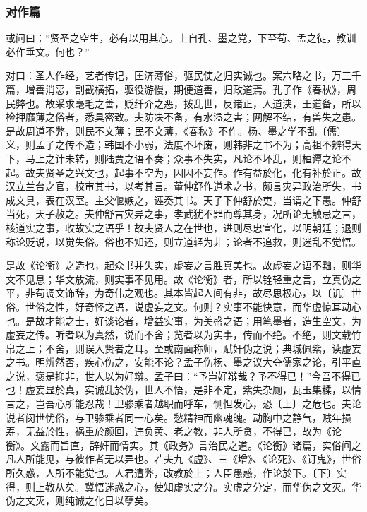 \documentclass[]{article}
\begin{document}
\hypertarget{header-n904}{%
\subsubsection{对作篇}\label{header-n904}}

或问曰：``贤圣之空生，必有以用其心。上自孔、墨之党，下至苟、孟之徒，教训必作垂文。何也？''

对曰：圣人作经，艺者传记，匡济薄俗，驱民使之归实诚也。案六略之书，万三千篇，增善消恶，割截横拓，驱役游慢，期便道善，归政道焉。孔子作《春秋》，周民弊也。故采求毫毛之善，贬纤介之恶，拨乱世，反诸正，人道浃，王道备，所以检押靡薄之俗者，悉具密致。夫防决不备，有水溢之害；网解不结，有兽失之患。是故周道不弊，则民不文薄；民不文薄，《春秋》不作。杨、墨之学不乱〔儒〕义，则孟子之传不造；韩国不小弱，法度不坏废，则韩非之书不为；高祖不辨得天下，马上之计未转，则陆贾之语不奏；众事不失实，凡论不坏乱，则桓谭之论不起。故夫贤圣之兴文也，起事不空为，因因不妄作。作有益於化，化有补於正。故汉立兰台之官，校审其书，以考其言。董仲舒作道术之书，颇言灾异政治所失，书成文具，表在汉室。主父偃嫉之，诬奏其书。天子下仲舒於吏，当谓之下愚。仲舒当死，天子赦之。夫仲舒言灾异之事，孝武犹不罪而尊其身，况所论无触忌之言，核道实之事，收故实之语乎！故夫贤人之在世也，进则尽忠宣化，以明朝廷；退则称论贬说，以觉失俗。俗也不知还，则立道轻为非；论者不追救，则迷乱不觉悟。

是故《论衡》之造也，起众书并失实，虚妄之言胜真美也。故虚妄之语不黜，则华文不见息；华文放流，则实事不见用。故《论衡》者，所以铨轻重之言，立真伪之平，非苟调文饰辞，为奇伟之观也。其本皆起人间有非，故尽思极心，以〔讥〕世俗。世俗之性，好奇怪之语，说虚妄之文。何则？实事不能快意，而华虚惊耳动心也。是故才能之士，好谈论者，增益实事，为美盛之语；用笔墨者，造生空文，为虚妄之传。听者以为真然，说而不舍；览者以为实事，传而不绝。不绝，则文载竹帛之上；不舍，则误入贤者之耳。至或南面称师，赋奸伪之说；典城佩紫，读虚妄之书。明辨然否，疾心伤之，安能不论？孟子伤杨、墨之议大夺儒家之论，引平直之说，褒是抑非，世人以为好辩。孟子曰：``予岂好辩哉？予不得已！''今吾不得已也！虚妄显於真，实诚乱於伪，世人不悟，是非不定，紫失杂厕，瓦玉集糅，以情言之，岂吾心所能忍哉！卫骖乘者越职而呼车，恻怛发心，恐〔上〕之危也。夫论说者闵世忧俗，与卫骖乘者同一心矣。愁精神而幽魂魄。动胸中之静气，贼年损寿，无益於性，祸重於颜回，违负黄、老之教，非人所贪，不得已，故为《论衡》。文露而旨直，辞奸而情实。其《政务》言治民之道。《论衡》诸篇，实俗间之凡人所能见，与彼作者无以异也。若夫九《虚》、三《增》、《论死》、《订鬼》，世俗所久惑，人所不能觉也。人君遭弊，改教於上；人臣愚惑，作论於下。〔下〕实得，则上教从矣。冀悟迷惑之心，使知虚实之分。实虚之分定，而华伪之文灭。华伪之文灭，则纯诚之化日以孽矣。
\end{document}
